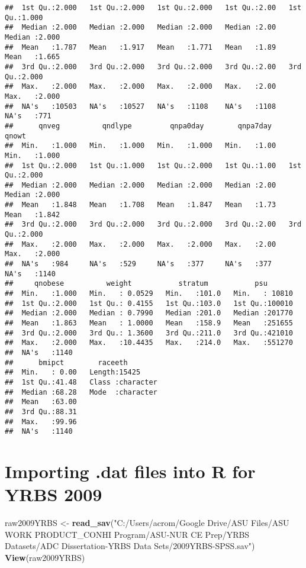 \documentclass[
]{article}
\newenvironment{Shaded}{\begin{snugshade}}{\end{snugshade}}
\newcommand{\FunctionTok}[1]{\textcolor[rgb]{0.13,0.29,0.53}{\textbf{#1}}}
\newcommand{\NormalTok}[1]{#1}
\newcommand{\OtherTok}[1]{\textcolor[rgb]{0.56,0.35,0.01}{#1}}
\newcommand{\StringTok}[1]{\textcolor[rgb]{0.31,0.60,0.02}{#1}}
\begin{document}
\begin{verbatim}
##  1st Qu.:2.000   1st Qu.:2.000   1st Qu.:2.000   1st Qu.:2.00   1st Qu.:1.000  
##  Median :2.000   Median :2.000   Median :2.000   Median :2.00   Median :2.000  
##  Mean   :1.787   Mean   :1.917   Mean   :1.771   Mean   :1.89   Mean   :1.665  
##  3rd Qu.:2.000   3rd Qu.:2.000   3rd Qu.:2.000   3rd Qu.:2.00   3rd Qu.:2.000  
##  Max.   :2.000   Max.   :2.000   Max.   :2.000   Max.   :2.00   Max.   :2.000  
##  NA's   :10503   NA's   :10527   NA's   :1108    NA's   :1108   NA's   :771    
##      qnveg          qndlype         qnpa0day        qnpa7day        qnowt      
##  Min.   :1.000   Min.   :1.000   Min.   :1.000   Min.   :1.00   Min.   :1.000  
##  1st Qu.:2.000   1st Qu.:1.000   1st Qu.:2.000   1st Qu.:1.00   1st Qu.:2.000  
##  Median :2.000   Median :2.000   Median :2.000   Median :2.00   Median :2.000  
##  Mean   :1.848   Mean   :1.708   Mean   :1.847   Mean   :1.73   Mean   :1.842  
##  3rd Qu.:2.000   3rd Qu.:2.000   3rd Qu.:2.000   3rd Qu.:2.00   3rd Qu.:2.000  
##  Max.   :2.000   Max.   :2.000   Max.   :2.000   Max.   :2.00   Max.   :2.000  
##  NA's   :984     NA's   :529     NA's   :377     NA's   :377    NA's   :1140   
##     qnobese          weight           stratum           psu        
##  Min.   :1.000   Min.   : 0.0529   Min.   :101.0   Min.   : 10810  
##  1st Qu.:2.000   1st Qu.: 0.4155   1st Qu.:103.0   1st Qu.:100010  
##  Median :2.000   Median : 0.7990   Median :201.0   Median :201770  
##  Mean   :1.863   Mean   : 1.0000   Mean   :158.9   Mean   :251655  
##  3rd Qu.:2.000   3rd Qu.: 1.3600   3rd Qu.:211.0   3rd Qu.:421010  
##  Max.   :2.000   Max.   :10.4435   Max.   :214.0   Max.   :551270  
##  NA's   :1140                                                      
##      bmipct        raceeth         
##  Min.   : 0.00   Length:15425      
##  1st Qu.:41.48   Class :character  
##  Median :68.28   Mode  :character  
##  Mean   :63.00                     
##  3rd Qu.:88.31                     
##  Max.   :99.96                     
##  NA's   :1140
\end{verbatim}

\hypertarget{importing-.dat-files-into-r-for-yrbs-2009}{%
\section{Importing .dat files into R for YRBS
2009}\label{importing-.dat-files-into-r-for-yrbs-2009}}

\begin{Shaded}
\begin{Highlighting}[]
\NormalTok{raw2009YRBS }\OtherTok{\textless{}{-}} \FunctionTok{read\_sav}\NormalTok{(}\StringTok{"C:/Users/acrom/Google Drive/ASU Files/ASU WORK PRODUCT\_CONHI Program/ASU{-}NUR CE Prep/YRBS Datasets/ADC Dissertation{-}YRBS Data Sets/2009YRBS{-}SPSS.sav"}\NormalTok{)}
\FunctionTok{View}\NormalTok{(raw2009YRBS)}
\end{Highlighting}
\end{Shaded}
\end{document}
